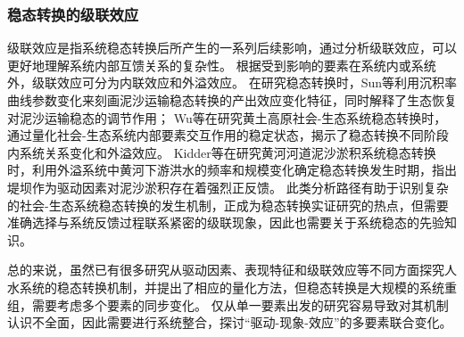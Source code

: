\subsubsection{稳态转换的级联效应}

级联效应是指系统稳态转换后所产生的一系列后续影响，通过分析级联效应，可以更好地理解系统内部互馈关系的复杂性\cite{rocha2018}。
根据受到影响的要素在系统内或系统外，级联效应可分为内联效应和外溢效应\cite{rocha2018}。
在研究稳态转换时，Sun等利用沉积率曲线参数变化来刻画泥沙运输稳态转换的产出效应变化特征，同时解释了生态恢复对泥沙运输稳态的调节作用\cite{sun2020}；
Wu等在研究黄土高原社会-生态系统稳态转换时，通过量化社会-生态系统内部要素交互作用的稳定状态，揭示了稳态转换不同阶段内系统关系变化和外溢效应\cite{wu2020a}。
Kidder等在研究黄河河道泥沙淤积系统稳态转换时，利用外溢系统中黄河下游洪水的频率和规模变化确定稳态转换发生时期，指出堤坝作为驱动因素对泥沙淤积存在着强烈正反馈\cite{kidder2015}。
此类分析路径有助于识别复杂的社会-生态系统稳态转换的发生机制，正成为稳态转换实证研究的热点，但需要准确选择与系统反馈过程联系紧密的级联现象，因此也需要关于系统稳态的先验知识。

总的来说，虽然已有很多研究从驱动因素、表现特征和级联效应等不同方面探究人水系统的稳态转换机制，并提出了相应的量化方法，但稳态转换是大规模的系统重组，需要考虑多个要素的同步变化。
仅从单一要素出发的研究容易导致对其机制认识不全面，因此需要进行系统整合，探讨“驱动-现象-效应”的多要素联合变化。
